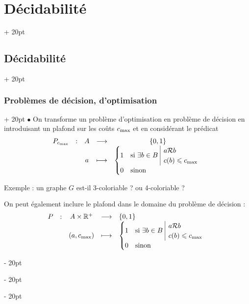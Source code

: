 \documentclass[a4paper, 12pt, twoside]{article}
\newcommand{\R}{\mathbb{R}} %
\newcommand{\set}[1]{\left\{ #1 \right\}}
\renewcommand{\le}{\leqslant}
\newcommand{\ind}[1][20pt]{\advance\leftskip + #1}
\newcommand{\deind}[1][20pt]{\advance\leftskip - #1}
\newenvironment{indt}[2][20pt]{#2 \par \ind[#1]}{\par \deind} %
\begin{document}
\begin{indt}{\section{Décidabilité}}
\begin{indt}{\subsection{Décidabilité}}
\begin{indt}{\subsubsection{Problèmes de décision, d'optimisation}}
                $\bullet$ On transforme un problème d'optimisation en problème de décision en introduisant un plafond sur les coûts $c_{\rm max}$ et en considérant le prédicat
                \[
                    \begin{array}{ccccc}
                        P_{c_{\rm max}}
                        & : & A & \longrightarrow & \set{0, 1}
                        \\
                        && a & \longmapsto &
                        \begin{cases}
                            1 & \text{si}\ \exists b \in B\
                            \begin{array}{|l}
                                a \mathcal R b
                                \\
                                c(b) \le c_{\rm max}
                            \end{array}
                            \\
                            0 & \text{sinon}
                        \end{cases}
                    \end{array}
                \]

                Exemple : un graphe $G$ est-il 3-coloriable ? ou 4-coloriable ?

                On peut également inclure le plafond dans le domaine du problème de décision :
                \[
                    \begin{array}{ccccl}
                        P
                        & : & A \times \R^+ & \longrightarrow & \set{0, 1}
                        \\
                        && (a, c_{\rm max}) & \longmapsto &
                        \begin{cases}
                            1 & \text{si}\ \exists b \in B\
                            \begin{array}{|l}
                                a \mathcal R b
                                \\
                                c(b) \le c_{\rm max}
                            \end{array}
                            \\
                            0 & \text{sinon}
                        \end{cases}
                    \end{array}
                \]


\end{indt}
\end{indt}
\end{indt}
\end{document}
